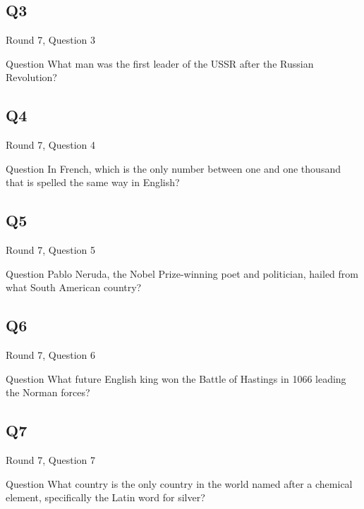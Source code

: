 \documentclass[11pt]{beamer}
\begin{document}
\subsection*{Q3}
\begin{frame}[t]{Round 7, Question 3}
\vspace{2em}
\begin{block}{Question}
What man was the first leader of the USSR after the Russian Revolution\@?
\end{block}
\end{frame}
    

\subsection*{Q4}
\begin{frame}[t]{Round 7, Question 4}
\vspace{2em}
\begin{block}{Question}
In French, which is the only number between one and one thousand that is spelled the same way in English\@?
\end{block}
\end{frame}
    

\subsection*{Q5}
\begin{frame}[t]{Round 7, Question 5}
\vspace{2em}
\begin{block}{Question}
Pablo Neruda, the Nobel Prize-winning poet and politician, hailed from what South American country\@?
\end{block}
\end{frame}
    

\subsection*{Q6}
\begin{frame}[t]{Round 7, Question 6}
\vspace{2em}
\begin{block}{Question}
What future English king won the Battle of Hastings in 1066 leading the Norman forces\@?
\end{block}
\end{frame}
    

\subsection*{Q7}
\begin{frame}[t]{Round 7, Question 7}
\vspace{2em}
\begin{block}{Question}
What country is the only country in the world named after a chemical element, specifically the Latin word for silver\@?
\end{block}
\end{frame}
    
\end{document}
